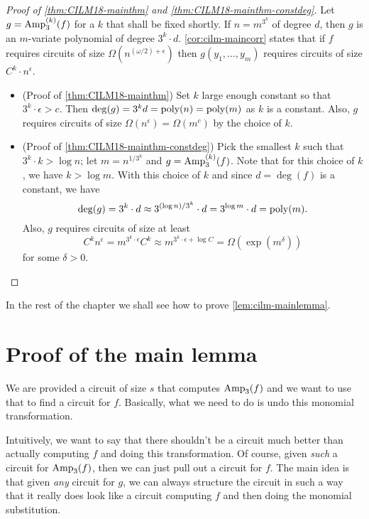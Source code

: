 \begin{proof}[Proof of \autoref{thm:CILM18-mainthm} and \autoref{thm:CILM18-mainthm-constdeg}]
  Let $g = \operatorname{Amp}_3^{(k)}(f)$ for a $k$ that shall be fixed shortly. If $n = m^{3^k}$ of degree $d$, then $g$ is an $m$-variate polynomial of degree $3^k \cdot d$. \autoref{cor:cilm-maincorr} states that if $f$ requires circuits of size $\Omega(n^{(\omega/2) + \epsilon})$ then $g(y_1,\ldots, y_m)$ requires circuits of size $C^k \cdot n^\epsilon$.

  \begin{itemize}
  \item (Proof of \autoref{thm:CILM18-mainthm}) Set $k$ large enough constant so that $3^k \cdot \epsilon > c$. Then $\deg(g) = 3^k d = \operatorname{poly}(n) = \operatorname{poly}(m)$ as $k$ is a constant. Also, $g$ requires circuits of size $\Omega(n^\epsilon) = \Omega(m^c)$ by the choice of $k$.

  \item (Proof of \autoref{thm:CILM18-mainthm-constdeg}) Pick the smallest $k$ such that $3^k \cdot k > \log n$; let $m = n^{1/3^k}$ and $g = \operatorname{Amp}_3^{(k)}(f)$.
Note that for this choice of $k$, we have $k > \log m$. 
    With this choice of $k$ and since $d = \deg(f)$ is a constant, we have
    \[
      \deg(g) = 3^k \cdot d \approx 3^{(\log n) / 3^k} \cdot d = 3^{\log m} \cdot d = \operatorname{poly}(m).
    \]
    Also, $g$ requires circuits of size at least
    \[
      C^k n^\epsilon = m^{3^k \cdot \epsilon} C^k \approx m^{3^k \cdot \epsilon + \log C}= \Omega(\exp(m^\delta))
    \]
    for some $\delta > 0$. \qedhere
  \end{itemize}
\end{proof}

\noindent
In the rest of the chapter we shall see how to prove \autoref{lem:cilm-mainlemma}.

\section{Proof of the main lemma}

We are provided a circuit of size $s$ that computes $\operatorname{Amp}_3(f)$ and we want to use that to find a circuit for $f$. Basically, what we need to do is undo this monomial transformation.

Intuitively, we want to say that there shouldn't be a circuit much better than actually computing $f$ and doing this transformation. Of course, given \emph{such} a circuit for $\operatorname{Amp}_3(f)$, then we can just pull out a circuit for $f$. The main idea is that given \emph{any} circuit for $g$, we can always structure the circuit in such a way that it really does look like a circuit computing $f$ and then doing the monomial substitution.

